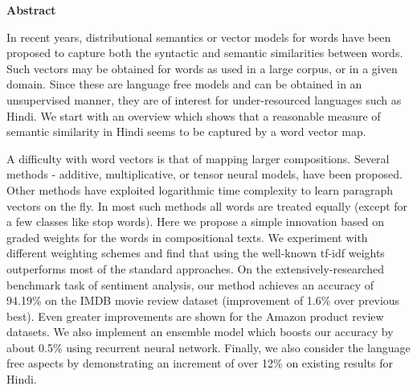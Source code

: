 \cleardoublepage

\begin{center}
	\huge{\textbf{Abstract}}
\end{center}

In recent years, distributional semantics or vector models for words have been proposed to capture both the syntactic and semantic similarities between words.  Such vectors may be obtained for words as used in a large corpus, or in a given domain.  Since these are language free models and can be obtained in an unsupervised manner, they are of interest for under-resourced languages such as Hindi.  We start with an overview which shows that a reasonable measure of semantic similarity in Hindi seems to be captured by a word vector map.

A difficulty with word vectors is that of mapping larger compositions. Several methods - additive, multiplicative, or tensor neural models, have been proposed. Other methods have exploited logarithmic time complexity to learn paragraph vectors on the fly.  In most such methods all words are treated equally (except for a few classes like stop words).  Here we propose a simple innovation based on graded weights for the words in compositional texts.  We experiment with different weighting schemes and find that using the well-known tf-idf weights outperforms most of the standard approaches.  On the extensively-researched benchmark task of sentiment analysis, our method achieves an accuracy of 94.19\% on the IMDB movie review dataset  (improvement of 1.6\% over previous best).  Even greater improvements are shown for the Amazon product review datasets. We also implement an ensemble model which boosts our accuracy by about 0.5\% using recurrent neural network.  Finally, we also consider the language free aspects by demonstrating an increment of over 12\% on existing results for Hindi.
